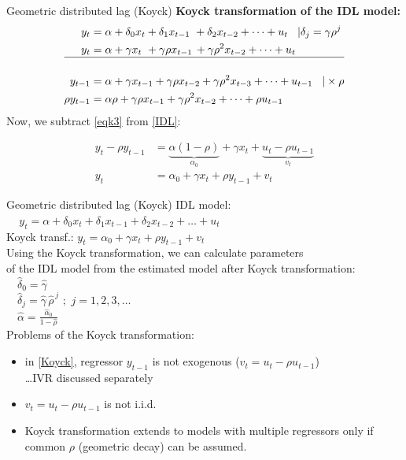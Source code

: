 \documentclass{beamer}
\begin{document}
\begin{frame}{Geometric distributed lag (Koyck) }
\textbf{Koyck transformation of the IDL model:}
\begin{align} 
y_t & = \alpha + \delta_0 x_t  + \delta_1 x_{t-1} \,\,+ \delta_2 x_{t-2} + \dots + u_t \hspace{0.3cm} |\delta_j = \gamma \rho^j  \notag \\
y_t & = \alpha + \gamma x_t \,\,+ \gamma\rho x_{t-1} \,+ \gamma\rho^2 x_{t-2}+\dots + u_t  \label{IDL} \\ \hline \notag \\ 
y_{t-1} & = \alpha + \gamma x_{t-1} + \gamma\rho x_{t-2} + \gamma\rho^2 x_{t-3} + \dots+u_{t-1} \hspace{0.3cm} |\times \rho 
\\ \label{eqk3}
\rho y_{t-1} & = \alpha\rho + \gamma\rho x_{t-1} + \gamma \rho^2 x_{t-2} + \dots + \rho u_{t-1}
\end{align}
\centering Now, we subtract \eqref{eqk3} from \eqref{IDL}: \par
\begin{align}
y_t-\rho y_{t-1} & = \underbrace{\alpha(1-\rho)}_{\alpha_{0}}+\gamma x_t + \underbrace{u_t-\rho u_{t-1}}_{v_t}\\
y_t & = \alpha_0 + \gamma x_t + \rho y_{t-1} + v_t \label{Koyck}
\end{align}
\end{frame}
\begin{frame}{Geometric distributed lag (Koyck) }
IDL model: $\quad \,y_t = \alpha + \delta_0 x_t  + \delta_1 x_{t-1} + \delta_2 x_{t-2} + \dots + u_t $\\
\medskip
Koyck transf.: $y_t = \alpha_0 + \gamma x_t + \rho y_{t-1} + v_t$ \\
\medskip
Using the Koyck transformation, we can calculate parameters \\of the IDL model from the estimated model after Koyck transformation:\\
\medskip
$\quad \hat{\delta}_0 = \hat{\gamma}$ \\
\medskip
$\quad \hat{\delta}_j = \hat{\gamma} \, \hat{\rho}^{\,j} \,\, ; \,\, j = 1,2,3, \dots$ \\
\medskip
$\quad \hat{\alpha} = \frac{\hat{\alpha}_0}{1-\hat{\rho}}$\\
\medskip
Problems of the Koyck transformation:
\begin{itemize}
    \item in \eqref{Koyck}, regressor $y_{t-1}$ is not exogenous ($v_t=u_t-\rho u_{t-1}$)\\ \dots IVR discussed separately
    \item $v_t=u_t-\rho u_{t-1}$ is not i.i.d.
    \item Koyck transformation extends to models with multiple regressors only if common $\rho$ (geometric decay) can be assumed.
\end{itemize}
\end{frame}
\end{document}
